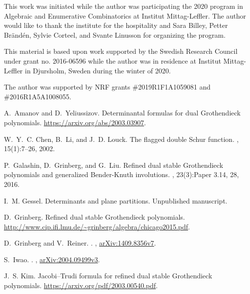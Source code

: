 \documentclass[12pt]{amsart}
\numberwithin{equation}{section}
\theoremstyle{definition}
\begin{document}
This work was initiated while the author was participating the 2020 program in
Algebraic and Enumerative Combinatorics at Institut Mittag-Leffler. The author
would like to thank the institute for the hospitality and Sara Billey, Petter
Br\"and\'en, Sylvie Corteel, and Svante Linusson for organizing the program.


This material is based upon work supported by the Swedish Research
Council under grant no. 2016-06596 while the author was in residence at Institut
Mittag-Leffler in Djursholm, Sweden during the winter of 2020.

The author was supported by NRF grants \#2019R1F1A1059081 and \#2016R1A5A1008055.

\begin{thebibliography}{10}

A.~Amanov and D.~Yeliussizov.
\newblock Determinantal formulas for dual {G}rothendieck polynomials.
\newblock \url{https://arxiv.org/abs/2003.03907}.

W.~Y.~C. Chen, B.~Li, and J.~D. Louck.
\newblock The flagged double {S}chur function.
, 15(1):7--26, 2002.

P.~Galashin, D.~Grinberg, and G.~Liu.
\newblock Refined dual stable {G}rothendieck polynomials and generalized
  {B}ender-{K}nuth involutions.
, 23(3):Paper 3.14, 28, 2016.

I.~M. Gessel.
\newblock Determinants and plane partitions.
\newblock Unpublished manuscript.

D.~Grinberg.
\newblock Refined dual stable {G}rothendieck polynomials.
\newblock \url{http://www.cip.ifi.lmu.de/~grinberg/algebra/chicago2015.pdf}.

D.~Grinberg and V.~Reiner.
.
,
  \href{https://arxiv.org/abs/1409.8356v7}{arXiv:1409.8356v7}.

S.~Iwao.
.
,
  \href{https://arxiv.org/abs/2004.09499v3}{arXiv:2004.09499v3}.

J.~S. Kim.
\newblock Jacobi--{T}rudi formula for refined dual stable {G}rothendieck
  polynomials.
\newblock \url{https://arxiv.org/pdf/2003.00540.pdf}.


\end{thebibliography}
\end{document}
